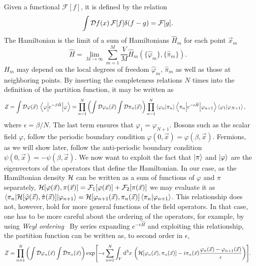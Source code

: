 Given a functional $\mathcal{F}[f]$, it is defined by the relation
\begin{equation}
    \int \mathcal D f(x)\, \mathcal{F}[f] \delta(f - g) = \mathcal{F}[g].
\end{equation}
The Hamiltonian is the limit of a sum of Hamiltonians $\hat H_m$ for each point $\vec x_m$
\begin{equation*}
    \hat H
    = \lim_{M \rightarrow \infty} \sum_{m=1}^M 
    \frac{V}{M} \hat H_m(\{\hat \varphi_m\}, \{\hat \pi_m\}).
\end{equation*}
$H_m$ may depend on the local degrees of freedom $\hat \varphi_m, \, \hat \pi_m$ as well as those at neighboring points.
By inserting the completeness relations 
$N$ times into the definition of the partition function, it may be written as
\begin{align*}
    Z& 
    = \int \mathcal D\varphi(\vec x) \, \left\langle \varphi {\left| e^{- \beta \hat H} \right|} \varphi \right\rangle
    = 
    \prod_{n=1}^N
    \left(
        \int \mathcal D \varphi_n (\vec x) \int \mathcal D \pi_n(\vec x)
    \right) 
    \prod_{n=1}^N  \braket{\varphi_n}{\pi_n}
    \left\langle \pi_n {\left| e^{- \epsilon \hat H} \right|} \varphi_{n+1} \right\rangle \braket{\varphi_{1}}{\varphi_{N+1}},
\end{align*}
where $\epsilon = \beta / N$. The last term ensures that $\varphi_1 = \varphi_{N+1}$.
Bosons such as the scalar field $\varphi$, follow the periodic boundary condition $\varphi(0, \vec x) = \varphi(\beta, \vec x)$.
Fermions, as we will show later, follow the anti-periodic boundary condition $\psi(0, \vec x) = -\psi(\beta, \vec x)$.
We now want to exploit the fact that $\ket{\pi}$ and $\ket{\varphi}$ are the eigenvectors of the operators that define the Hamiltonian.
In our case, as the Hamiltonian density $\mathcal{H}$ can be written as a sum of functions of $\varphi$ and $\pi$ separately, $\mathcal{H}[\varphi(\vec x), \pi(\vec x)] = \mathcal{F}_1[\varphi(\vec x)] + \mathcal{F}_2[\pi(\vec x)]$ we may evaluate it as $\left\langle \pi_n {\left| \mathcal{H}[\hat \varphi(\vec x), \hat \pi(\vec x)] \right|} \varphi_{n+1} \right\rangle = \mathcal{H}[\varphi_{n+1}(\vec x), \pi_n(\vec x)] \braket{\pi_n}{\varphi_{n+1}}$.
This relationship does not, however, hold for more general functions of the field operators.
In that case, one has to be more careful about the ordering of the operators, for example, by using \emph{Weyl ordering}~
By series expanding $e^{-\epsilon \hat H}$ and exploiting this relationship, the partition function can be written as, to second order in $\epsilon$,
\begin{align*}
    Z = 
    \prod_{n=1}^N  
    \left(
        \int \mathcal D \varphi_n (\vec x) \int \mathcal D \pi_n(\vec x)
    \right)
    \exp[-\epsilon \sum_{n=1}^N \int_V \dd^3x \,
    \left(
        \mathcal{H}[\varphi_n(\vec x), \pi_n(\vec x)] - i \pi_n(\vec x) \frac{\varphi_n(\vec x) - \varphi_{n+1}(\vec x)}{\epsilon}
    \right)
    ].
\end{align*}
